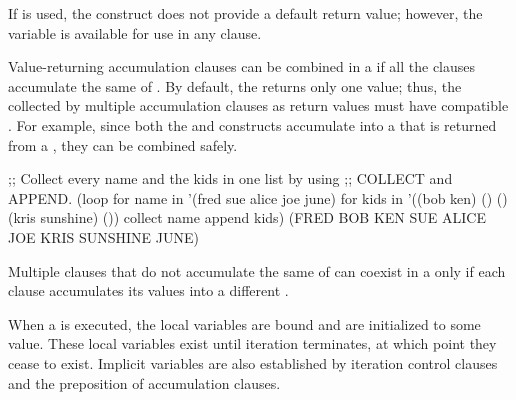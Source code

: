 If  is used,
the construct does not provide a default return value;
however, the variable is available
for use in any  clause.  
     
 
Value-returning accumulation clauses can be combined in a  if
all the clauses accumulate the same  of .  
By default, the {\LoopFacility} returns only one value;
thus, the  collected by multiple accumulation clauses 
as return values must have compatible . For example, since both
the  and  constructs accumulate 
 into a
 that is returned from a 
, they can be combined safely.

\code
;; Collect every name and the kids in one list by using 
;; COLLECT and APPEND.
 (loop for name in '(fred sue alice joe june)
       for kids in '((bob ken) () () (kris sunshine) ())
       collect name
       append kids)
\EV (FRED BOB KEN SUE ALICE JOE KRIS SUNSHINE JUNE)
\endcode
 
Multiple clauses that do not accumulate the same  of 
can coexist in a  only 
if each clause accumulates its values into 
a different
.  

% 
 
 


 
When a   is executed, the local variables are bound and are
initialized to some value.  These local variables exist until 
iteration terminates, at which point they cease to exist.  
Implicit variables are also established by iteration control clauses and the
 preposition of accumulation clauses.

